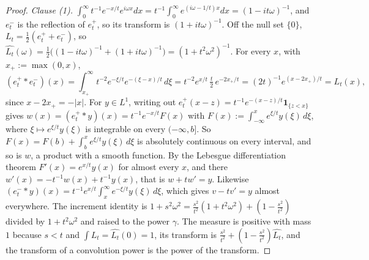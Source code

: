 \begin{proof}
\emph{Clause (1).} $\int_0^\infty t^{-1}e^{-x/t}e^{i\omega x}dx = t^{-1}\int_0^\infty
e^{(i\omega - 1/t)x}dx = (1 - it\omega)^{-1}$, and $e^-_t$ is the reflection of $e^+_t$, so its
transform is $(1 + it\omega)^{-1}$. Off the null set $\{0\}$, $L_t = \tfrac12(e^+_t + e^-_t)$, so
$\widehat{L_t}(\omega) = \tfrac12\bigl((1 - it\omega)^{-1} + (1 + it\omega)^{-1}\bigr) =
(1 + t^2\omega^2)^{-1}$. For every $x$, with $x_+ := \max(0, x)$,
\[
  (e^+_t * e^-_t)(x) = \int_{x_+}^\infty t^{-2}e^{-\xi/t}e^{-(\xi-x)/t}\,d\xi
   = t^{-2}e^{x/t}\,\tfrac t2\,e^{-2x_+/t} = (2t)^{-1}e^{(x - 2x_+)/t} = L_t(x) ,
\]
since $x - 2x_+ = -|x|$. For $y \in L^1$, writing out
$e^+_t(x - z) = t^{-1}e^{-(x-z)/t}\mathbf 1_{\{z < x\}}$ gives
$w(x) = (e^+_t * y)(x) = t^{-1}e^{-x/t}F(x)$ with $F(x) := \int_{-\infty}^xe^{\xi/t}y(\xi)\,d\xi$, where
$\xi \mapsto e^{\xi/t}y(\xi)$ is integrable on every $(-\infty, b]$. So
$F(x) = F(b) + \int_b^xe^{\xi/t}y(\xi)\,d\xi$ is absolutely continuous on every interval, and so is
$w$, a product with a smooth function. By the Lebesgue differentiation theorem
$F'(x) = e^{x/t}y(x)$ for almost every $x$, and there $w'(x) = -t^{-1}w(x) + t^{-1}y(x)$, that is
$w + tw' = y$. Likewise $(e^-_t * y)(x) = t^{-1}e^{x/t}\int_x^\infty e^{-\xi/t}y(\xi)\,d\xi$, which
gives $v - tv' = y$ almost everywhere. The increment identity is
$1 + s^2\omega^2 = \tfrac{s^2}{t^2}(1 + t^2\omega^2) + (1 - \tfrac{s^2}{t^2})$ divided by
$1 + t^2\omega^2$ and raised to the power $\gamma$. The measure is positive with mass $1$ because
$s < t$ and $\int L_t = \widehat{L_t}(0) = 1$, its transform is
$\tfrac{s^2}{t^2} + (1 - \tfrac{s^2}{t^2})\widehat{L_t}$, and the transform of a convolution power
is the power of the transform.


\end{proof}
